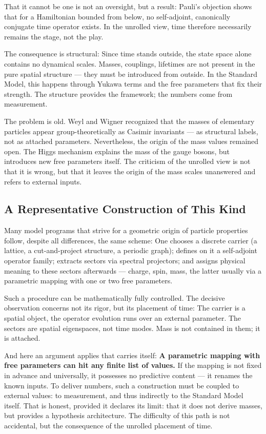 That it cannot be one is not an oversight, but a result:
Pauli's objection shows that for a Hamiltonian bounded from below,
no self-adjoint, canonically conjugate
time operator exists. In the unrolled view, time therefore necessarily remains the stage, not the play.

The consequence is structural: Since time stands outside, the state space
alone contains no dynamical scales. Masses, couplings,
lifetimes are not present in the pure spatial structure --- they
must be introduced from outside. In the Standard Model, this happens
through Yukawa terms and the free parameters that fix their strength. The structure provides the framework; the numbers come from
measurement.

The problem is old. Weyl and Wigner recognized that the masses of
elementary particles appear group-theoretically as Casimir invariants
--- as structural labels, not as attached parameters.
Nevertheless, the origin of the mass values remained open. The Higgs mechanism explains
the mass of the gauge bosons, but introduces new free parameters itself.
The criticism of the unrolled view is not that it is wrong,
but that it leaves the origin of the mass scales unanswered and
refers to external inputs.

\subsection*{A Representative Construction of This Kind}

Many model programs that strive for a geometric origin of
particle properties follow, despite all differences, the same
scheme: One chooses a discrete carrier (a lattice, a
cut-and-project structure, a periodic graph); defines on it
a self-adjoint operator family; extracts sectors via
spectral projectors; and assigns physical meaning to these sectors
afterwards --- charge, spin, mass, the latter usually via
a parametric mapping with one or two free parameters.

Such a procedure can be mathematically fully controlled.
The decisive observation concerns not its rigor, but
its placement of time: The carrier is a spatial object, the
operator evolution runs over an external parameter. The sectors are
spatial eigenspaces, not time modes. Mass is not
contained in them; it is attached.

And here an argument applies that carries itself: \textbf{A
parametric mapping with free parameters can hit any finite
list of values.} If the mapping is not fixed in advance and universally,
it possesses no predictive content --- it renames the
known inputs. To deliver numbers, such a construction must
be coupled to external values: to measurement, and
thus indirectly to the Standard Model itself. That is honest, provided it declares its limit:
that it does not derive masses, but provides a
hypothesis architecture. The difficulty of this path is
not accidental, but the consequence of the unrolled placement of time.

